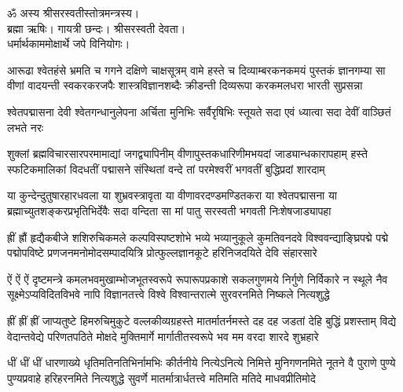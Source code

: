 
\setlength{\shlokaspaceskip}{12pt}
ॐ अस्य श्रीसरस्वतीस्तोत्रमन्त्रस्य।\\
ब्रह्मा ऋषिः। गायत्री छन्दः। श्रीसरस्वती देवता।\\
धर्मार्थकाममोक्षार्थे जपे विनियोगः।\\

\begin{minipage}{\linewidth}
\fourlineindentedshloka
{आरूढा श्वेतहंसे भ्रमति च गगने दक्षिणे चाक्षसूत्रम्}
{वामे हस्ते च दिव्याम्बरकनकमयं पुस्तकं ज्ञानगम्या}
{सा वीणां वादयन्ती स्वकरकरजपैः शास्त्रविज्ञानशब्दैः}
{क्रीडन्ती दिव्यरूपा करकमलधरा भारती सुप्रसन्ना}
\end{minipage}

\threelineshloka
{श्वेतपद्मासना देवी श्वेतगन्धानुलेपना}
{अर्चिता मुनिभिः सर्वैरृषिभिः स्तूयते सदा}
{एवं ध्यात्वा सदा देवीं वाञ्छितं लभते नरः}

\fourlineindentedshloka
{शुक्लां ब्रह्मविचारसारपरमामाद्यां जगद्व्यापिनीम्}
{वीणापुस्तकधारिणीमभयदां जाड्यान्धकारापहाम्}
{हस्ते स्फटिकमालिकां विदधतीं पद्मासने संस्थितां}
{वन्दे तां परमेश्वरीं भगवतीं बुद्धिप्रदां शारदाम्}

\fourlineindentedshloka
{या कुन्देन्दुतुषारहारधवला या शुभ्रवस्त्रावृता}
{या वीणावरदण्डमण्डितकरा या श्वेतपद्मासना}
{या ब्रह्माच्युतशङ्करप्रभृतिभिर्देवैः सदा वन्दिता}
{सा मां पातु सरस्वती भगवती निःशेषजाड्यापहा}

\fourlineindentedshloka
{ह्रीं ह्रौं हृद्यैकबीजे शशिरुचिकमले कल्पविस्पष्टशोभे}
{भव्ये भव्यानुकूले कुमतिवनदवे विश्ववन्द्याङ्घ्रिपद्मे}
{पद्मे पद्मोपविष्टे प्रणजनमनोमोदसम्पादयित्रि}
{प्रोत्फुल्लज्ञानकूटे हरिनिजदयिते देवि संहारसारे}

\fourlineindentedshloka
{ऐं ऐं ऐं दृष्टमन्त्रे कमलभवमुखाम्भोजभूतस्वरूपे}
{रूपारूपप्रकाशे सकलगुणमये निर्गुणे निर्विकारे}
{न स्थूले नैव सूक्ष्मेऽप्यविदितविभवे नापि विज्ञानतत्त्वे}
{विश्वे विश्वान्तरात्मे सुरवरनमिते निष्कले नित्यशुद्धे}

\fourlineindentedshloka
{ह्रीं ह्रीं ह्रीं जाप्यतुष्टे हिमरुचिमुकुटे वल्लकीव्यग्रहस्ते}
{मातर्मातर्नमस्ते दह दह जडतां देहि बुद्धिं प्रशस्ताम्}
{विद्ये वेदान्तवेद्ये परिणतपठिते मोक्षदे मुक्तिमार्गे}
{मार्गातीतस्वरूपे भव मम वरदा शारदे शुभ्रहारे}

\fourlineindentedshloka
{धीं धीं धीं धारणाख्ये धृतिमतिनतिभिर्नामभिः कीर्तनीये}
{नित्येऽनित्ये निमित्ते मुनिगणनमिते नूतने वै पुराणे}
{पुण्ये पुण्यप्रवाहे हरिहरनमिते नित्यशुद्धे सुवर्णे}
{मातर्मात्रार्धतत्त्वे मतिमति मतिदे माधवप्रीतिमोदे}

